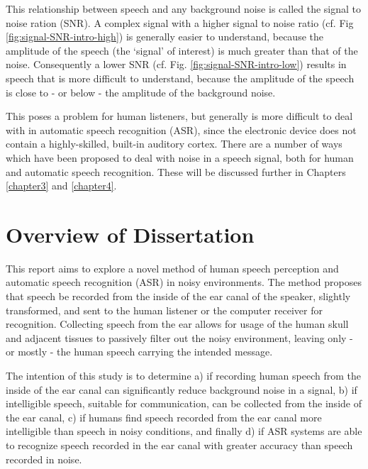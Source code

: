 This relationship between speech and any background noise is called the signal to noise ration (SNR).  A complex signal with a higher signal to noise ratio (cf. Fig \ref{fig:signal-SNR-intro-high}) is generally easier to understand, because the amplitude of the speech (the `signal' of interest) is much greater than that of the noise.  Consequently a lower SNR (cf. Fig. \ref{fig:signal-SNR-intro-low}) results in speech that is more difficult to understand, because the amplitude of the speech is close to - or below - the amplitude of the background noise.

This poses a problem for human listeners, but generally is more difficult to deal with in automatic speech recognition (ASR), since the electronic device does not contain a highly-skilled, built-in auditory cortex.  There are a number of ways which have been proposed to deal with noise in a speech signal, both for human and automatic speech recognition.  These will be discussed further in Chapters \ref{chapter3} and \ref{chapter4}.

\section{Overview of Dissertation}\label{ch1:diss-overview}

This report aims to explore a novel method of human speech perception and automatic speech recognition (ASR) in noisy environments.  The method proposes that speech be recorded from the inside of the ear canal of the speaker, slightly transformed, and sent to the human listener or the computer receiver for recognition.  Collecting speech from the ear allows for usage of the human skull and adjacent tissues to passively filter out the noisy environment, leaving only - or mostly - the human speech carrying the intended message.  

The intention of this study is to determine a) if recording human speech from the inside of the ear canal can significantly reduce background noise in a signal, b) if intelligible speech, suitable for communication, can be collected from the inside of the ear canal, c) if humans find speech recorded from the ear canal more intelligible than speech in noisy conditions, and finally d) if ASR systems are able to recognize speech recorded in the ear canal with greater accuracy than speech recorded in noise.

